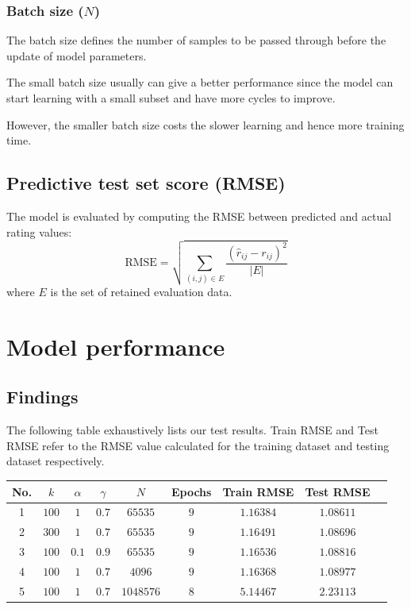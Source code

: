 \documentclass[final]{cvpr}
\begin{document}
\subsubsection{Batch size ($N$)}
The batch size defines the number of samples to be passed through before the update of model parameters.

The small batch size usually can give a better performance since the model can start learning with a small subset and have more cycles to improve.

However, the smaller batch size costs the slower learning and hence more training time.

\subsection{Predictive test set score (RMSE)}
The model is evaluated by computing the RMSE between predicted and actual rating values:
$$ \text{RMSE} = \sqrt{\sum_{(i, j) \in E} \frac{{(\hat r_{ij} - r_{ij})}^2}{\left| E \right|}} $$
where $E$ is the set of retained evaluation data.

\section{Model performance}
\subsection{Findings}
The following table exhaustively lists our test results. Train RMSE and Test RMSE refer to the RMSE value calculated for the training dataset and testing dataset respectively.

\begin{tabular}{|c|c|c|c|c|c|c|c|c|}
	\hline
	No. & $k$ & $\alpha$ & $\gamma$ & $N$ & Epochs & Train RMSE & Test RMSE
	\\ \hline
	1 & $100$ & $1$ & $0.7$ & $65535$ & $9$ & $1.16384$ & $1.08611$
	\\ \hline
	2 & $300$ & $1$ & $0.7$ & $65535$ & $9$ & $1.16491$ & $1.08696$
	\\ \hline
	3 & $100$ & $0.1$ & $0.9$ & $65535$ & $9$ & $1.16536$ & $1.08816$
	\\ \hline
	4 & $100$ & $1$ & $0.7$ & $4096$ & $9$ & $1.16368$ & $1.08977$
	\\ \hline
	5 & $100$ & $1$ & $0.7$ & $1048576$ & $8$ & $5.14467$ & $2.23113$
	\\ \hline
\end{tabular}
\end{document}
